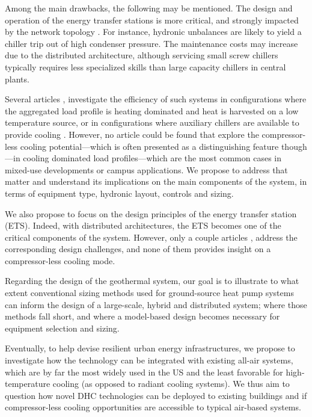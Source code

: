 Among the main drawbacks, the following may be mentioned.
The design and operation of the energy transfer stations is more critical, and strongly impacted by the network topology \citep{Wetter2019}. For instance, hydronic unbalances are likely to yield a chiller trip out of high condenser pressure.
The maintenance costs may increase due to the distributed architecture, although servicing small screw chillers typically requires less specialized skills than large capacity chillers in central plants.

Several articles \citep{Wetter2019}, \citep{Sommer2020} investigate the efficiency of such systems in configurations where the aggregated load profile is heating dominated and heat is harvested on a low temperature source, or in configurations where auxiliary chillers are available to provide cooling \citep{Gabrielli2020}.
However, no article could be found that explore the compressor-less cooling potential---which is often presented as a distinguishing feature though---in cooling dominated load profiles---which are the most common cases in mixed-use developments or campus applications.
We propose to address that matter and understand its implications on the main components of the system, in terms of equipment type, hydronic layout, controls and sizing.

We also propose to focus on the design principles of the energy transfer station (ETS).
Indeed, with distributed architectures, the ETS becomes one of the critical components of the system.
However, only a couple articles \citep{Buffa2020}, \citep{Wetter2019} address the corresponding design challenges, and none of them provides insight on a compressor-less cooling mode.

Regarding the design of the geothermal system, our goal is to illustrate to what extent conventional sizing methods used for ground-source heat pump systems \citep{Kavanaugh2014} can inform the design of a large-scale, hybrid and distributed system; where those methods fall short, and where a model-based design becomes necessary for equipment selection and sizing.

Eventually, to help devise resilient urban energy infrastructures, we propose to investigate how the technology can be integrated with existing all-air systems, which are by far the most widely used in the US and the least favorable for high-temperature cooling (as opposed to radiant cooling systems).
We thus aim to question how novel DHC technologies can be deployed to existing buildings and if compressor-less cooling opportunities are accessible to typical air-based systems.

